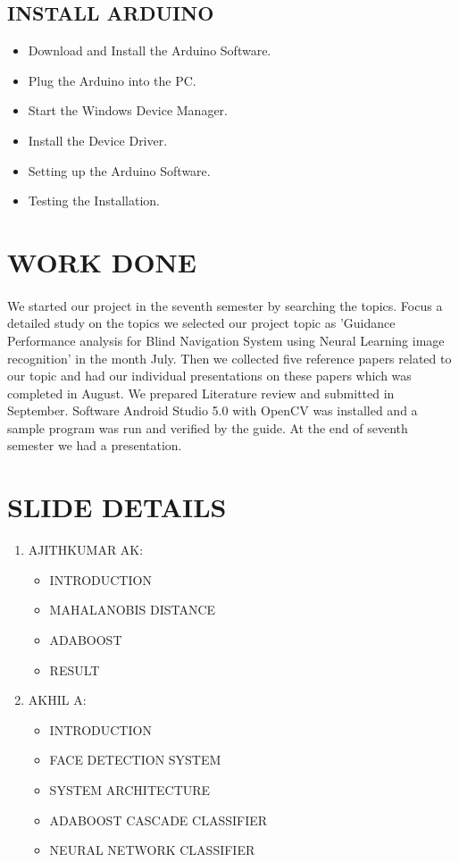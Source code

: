 \documentclass[11pt,a4paper,twoside]{report}
\begin{document}
\begin{appendix}
\begin{enumerate}
\end{enumerate}


\subsection{INSTALL ARDUINO}
\begin{itemize}
\item Download and Install the Arduino Software.
\item Plug the Arduino into the PC.
\item Start the Windows Device Manager.
\item Install the	 Device Driver.
\item Setting up the Arduino Software.
\item Testing the Installation.

\end{itemize}

\section{WORK DONE}
\paragraph{ }We started our project in the seventh semester by searching the topics. Focus a detailed study on the topics we selected our project topic as 'Guidance Performance analysis for Blind Navigation System using Neural Learning image recognition' in the month July. Then we collected five reference papers related to our topic and had our individual presentations on these papers which was completed in August. We prepared Literature review and submitted in September. Software Android Studio 5.0 with OpenCV
was installed and a sample program was run and verified by the guide. At the end of seventh semester we had a presentation.

\section{SLIDE DETAILS}
\begin{enumerate}


\item AJITHKUMAR AK:
\begin{itemize}


\item INTRODUCTION
\item MAHALANOBIS DISTANCE
\item ADABOOST
\item RESULT
\end{itemize}
\item AKHIL A:
\begin{itemize}
\item INTRODUCTION
\item FACE DETECTION SYSTEM
\item	SYSTEM ARCHITECTURE
\item	ADABOOST CASCADE CLASSIFIER
\item	NEURAL NETWORK CLASSIFIER


\end{itemize}
\end{enumerate}
\end{appendix}
\end{document}
